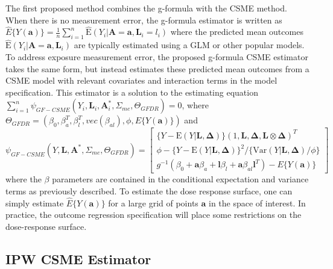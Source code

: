 \documentclass[useAMS,usenatbib,referee]{biom}
\begin{document}
\sloppy The first proposed method combines the g-formula with the CSME method. When there is no measurement error, the g-formula estimator is written as $\hat{E}\{ Y(\bm{a}) \} = \frac{1}{n} \sum_{i=1}^{n} \hat{\text{E}}(Y_{i} | \bm{A} = \bm{a}, \bm{L}_{i} = l_{i})$ where the predicted mean outcomes $\hat{\text{E}}(Y_{i} | \bm{A} = \bm{a}, \bm{L}_{i})$ are typically estimated using a GLM or other popular models. To address exposure measurement error, the proposed g-formula CSME estimator takes the same form, but instead estimates these predicted mean outcomes from a CSME model with relevant covariates and interaction terms in the model specification. This estimator is a solution to the estimating equation $\sum_{i=1}^{n} \psi_{GF-CSME}(Y_{i}, \bm{L}_{i}, \bm{A}_{i}^{*}, \Sigma_{me}, \Theta_{GFDR}) = 0$, where $\Theta_{GFDR} = (\beta_{0}, \beta^{T}_{a}, \beta^{T}_{l}, vec(\beta_{al}), \phi, E \{ Y(\bm{a}) \})$ and
\begin{equation}
    \psi_{GF-CSME}(Y, \bm{L}, \bm{A}^{*}, \Sigma_{me}, \Theta_{GFDR}) =
    \begin{bmatrix}
       \{ Y - \text{E}(Y | \bm{L}, \bm{\Delta}) \} (1, \bm{L}, \bm{\Delta}, \bm{L} \otimes \bm{\Delta})^{T} \\
        \phi - \{ Y - \text{E}(Y | \bm{L}, \bm{\Delta}) \}^{2} / \{ \text{Var}(Y | \bm{L}, \bm{\Delta}) / \phi \} \\
        g^{-1}(\beta_{0} + \bm{a}\beta_{a} + \bm{l}\beta_{l} +
        \bm{a}\beta_{al}\bm{l}^{T}) - E \{ Y(\bm{a}) \}
    \end{bmatrix}
\end{equation}
where the $\beta$ parameters are contained in the conditional expectation and variance terms as previously described. To estimate the dose response surface, one can simply estimate $\hat{E}\{ Y(\bm{a}) \}$ for a large grid of points $\bm{a}$ in the space of interest. In practice, the outcome regression specification will place some restrictions on the dose-response surface.

\subsection{IPW CSME Estimator}
\end{document}
